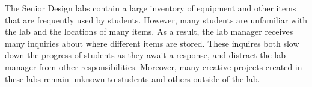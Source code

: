 The Senior Design labs contain a large inventory of equipment and other items that are frequently used by students. However, many students are unfamiliar with the lab and the locations of many items. As a result, the lab manager receives many inquiries about where different items are stored. These inquires both slow down the progress of students as they await a response, and distract the lab manager from other responsibilities. Moreover, many creative projects created in these labs remain unknown to students and others outside of the lab. 